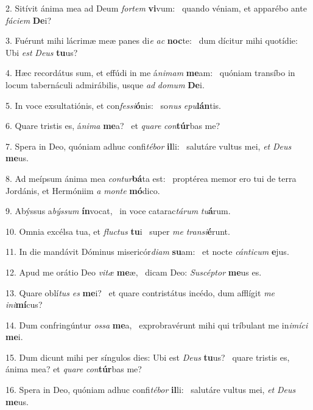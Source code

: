 2. Sitívit ánima mea ad Deum \textit{for}\textit{tem} \textbf{vi}vum: \ast\  quando véniam, et apparébo ante \textit{fá}\textit{ci}\textit{em} \textbf{De}i?\

3. Fuérunt mihi lácrimæ meæ panes di\textit{e} \textit{ac} \textbf{noc}te: \ast\  dum dícitur mihi quotídie: Ubi \textit{est} \textit{De}\textit{us} \textbf{tu}us?\

4. Hæc recordátus sum, et effúdi in me á\textit{ni}\textit{mam} \textbf{me}am: \ast\  quóniam transíbo in locum tabernáculi admirábilis, usque \textit{ad} \textit{do}\textit{mum} \textbf{De}i.\

5. In voce exsultatiónis, et con\textit{fes}\textit{si}\textbf{ó}nis: \ast\  so\textit{nus} \textit{e}\textit{pu}\textbf{lán}tis.\

6. Quare tristis es, á\textit{ni}\textit{ma} \textbf{me}a? \ast\  et \textit{qua}\textit{re} \textit{con}\textbf{túr}bas me?\

7. Spera in Deo, quóniam adhuc confi\textit{té}\textit{bor} \textbf{il}li: \ast\  salutáre vultus mei, \textit{et} \textit{De}\textit{us} \textbf{me}us.\

8. Ad meípsum ánima mea \textit{con}\textit{tur}\textbf{bá}ta est: \ast\  proptérea memor ero tui de terra Jordánis, et Hermóniim \textit{a} \textit{mon}\textit{te} \textbf{mó}dico.\

9. Abýssus a\textit{býs}\textit{sum} \textbf{ín}vocat, \ast\  in voce catarac\textit{tá}\textit{rum} \textit{tu}\textbf{á}rum.\

10. Omnia excélsa tua, et \textit{fluc}\textit{tus} \textbf{tu}i \ast\  super \textit{me} \textit{trans}\textit{i}\textbf{é}runt.\

11. In die mandávit Dóminus misericór\textit{di}\textit{am} \textbf{su}am: \ast\  et nocte \textit{cán}\textit{ti}\textit{cum} \textbf{e}jus.\

12. Apud me orátio Deo \textit{vi}\textit{tæ} \textbf{me}æ, \ast\  dicam Deo: \textit{Su}\textit{scép}\textit{tor} \textbf{me}us es.\

13. Quare oblí\textit{tus} \textit{es} \textbf{me}i? \ast\  et quare contristátus incédo, dum afflígit \textit{me} \textit{in}\textit{i}\textbf{mí}cus?\

14. Dum confringúntur \textit{os}\textit{sa} \textbf{me}a, \ast\  exprobravérunt mihi qui tríbulant me in\textit{i}\textit{mí}\textit{ci} \textbf{me}i.\

15. Dum dicunt mihi per síngulos dies: Ubi est \textit{De}\textit{us} \textbf{tu}us? \ast\  quare tristis es, ánima mea? et \textit{qua}\textit{re} \textit{con}\textbf{túr}bas me?\

16. Spera in Deo, quóniam adhuc confi\textit{té}\textit{bor} \textbf{il}li: \ast\  salutáre vultus mei, \textit{et} \textit{De}\textit{us} \textbf{me}us.\

